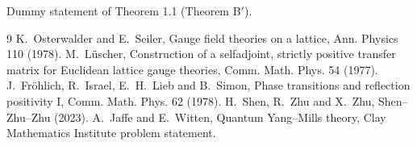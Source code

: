 

\setcounter{section}{3}
\begin{theorem}\label{thm:main}
Dummy statement of Theorem 1.1 (Theorem B$'$).
\end{theorem}

\begin{thebibliography}{9}
 K.~Osterwalder and E.~Seiler, Gauge field theories on a lattice, Ann. Physics 110 (1978).
 M.~L\"uscher, Construction of a selfadjoint, strictly positive transfer matrix for Euclidean lattice gauge theories, Comm. Math. Phys. 54 (1977).
 J.~Fr\"ohlich, R.~Israel, E.~H.~Lieb and B.~Simon, Phase transitions and reflection positivity I, Comm. Math. Phys. 62 (1978).
 H.~Shen, R.~Zhu and X.~Zhu, Shen--Zhu--Zhu (2023).
 A.~Jaffe and E.~Witten, Quantum Yang--Mills theory, Clay Mathematics Institute problem statement.
\end{thebibliography}

